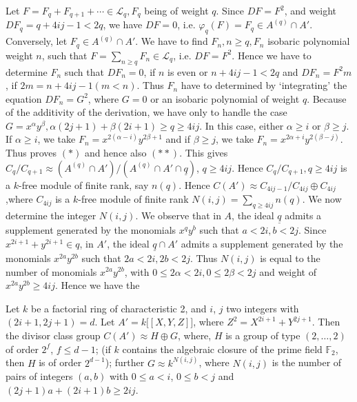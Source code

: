 \begin{proofif}
Let $F = F_q +  F_{q+1} + \cdots \in \mathscr{L}_q, F_q$ being of
weight $q$. Since $DF = F^2$, and weight $DF_q = q + 4ij - 1 < 2q$, we
have $DF = 0$, i.e. $\varphi_q (F) = F_q \in A^{(q) } \cap
A'$. Conversely, let $F_q \in A^{(q)} \cap A'$. We have  to find $F_n,
n \ge q, F_n$  isobaric polynomial weight $n$, such that $F =
\sum\limits_{n \ge q} F _n \in \mathscr{L}_q$, i.e. $DF = F^2$. Hence
we have to determine $F_n$ such that $DF_n = 0$, if $n$ is even or $n
+ 4 ij -1 < 2q$ and $DF_n = F^2m$, if $2m = n + 4 ij -1 (m < n)$. Thus
$F_n$ have to determined by `integrating' the equation $DF_n = G^2$,
where $G = 0$ or an isobaric polynomial of weight $q$. Because of the
additivity of the derivation, we have only to handle the case  $G =
x^\alpha y^\beta, \alpha (2 j +1) + \beta (2 i +1) \ge q \ge 4ij$. In
this case, either $\alpha \ge i$ or $\beta \ge j$. If $\alpha \geq i$, we
take $F_n = x^{2 (\alpha - i)} y^{2 \beta +1}$ and if $\beta \ge j$,
we take $F_n = x^{2 \alpha + i } y^{2(\beta - j)}$. Thus proves $(*)$
and hence also $(**)$. This gives $C_q \big / C_{q+1} \approx (A^{(q)}
\cap A')  \big/  (A^{(q)} \cap A' \cap \underline{q})$, $q \ge 4 ij$. Hence
$C_q\big / C_{q+1}, q \ge 4ij$ is a $k$-free module of finite rank, say
$n(q)$. Hence  $C(A') \approx C_{4ij - 1} \big/ C_{4 ij} \oplus
C_{4ij}$,\pageoriginale where $C_{4ij}$ is a $k$-free module of finite
rank $N (i, j) = 
\sum\limits_{q 
  \ge 4ij} n(q)$. We now determine the integer $N(i, j)$. We  observe
that in $A$, the ideal $\underline{q}$ admits a supplement generated by
the monomials $x^q y^b$ such that $a < 2 i, b <  2 j$. Since $x^{2i
  +1} + y^{2i +1} \in q$, in $A'$, the ideal $\underline{q} \cap A'$
admits a supplement generated by the monomials $x^{2a} y^{2b}$ such
that $2a < 2i, 2b < 2 j$. Thus $N (i, j)$ is equal to the number of
monomials $x^{2a} y^{2b}$, with $0 \le 2 \alpha < 2i, 0 \le 2 \beta <
2 j$ and weight of $x^{2a} y^{2b} \ge 4ij$. Hence we have the 
    \end{proofif}  


\setcounter{theorem}{1}
    \begin{theorem}\label{chap3:thm5.2} %
Let $k$ be a factorial ring of characteristic 2, and $i$, $j$ two
  integers with $(2 i + 1, 2j+1) = d$. Let $A' = k \big[[X, Y,
      Z]\big]$, where $Z^2 = X^{2i +1} + Y^{2 j +1}$. Then the divisor
  class group $C(A') \approx H \oplus G$, where, $H$ is a group of
  type $(2, \ldots , 2)$ of order $2^f$, $f \le d - 1$; (if $k$
  contains the algebraic closure of the prime field $\mathbb{F}_2$,
  then $H$ is of order $2^{d-1}$); further $G \approx k^{N (i, j)}$,
  where $N (i, j)$ is the number of pairs of integers $(a, b)$ with $0
  \le a < i$, $0 \le b < j$ and $(2j +1)a + (2i +1) b \ge 2ij$. 
    \end{theorem}  
      
